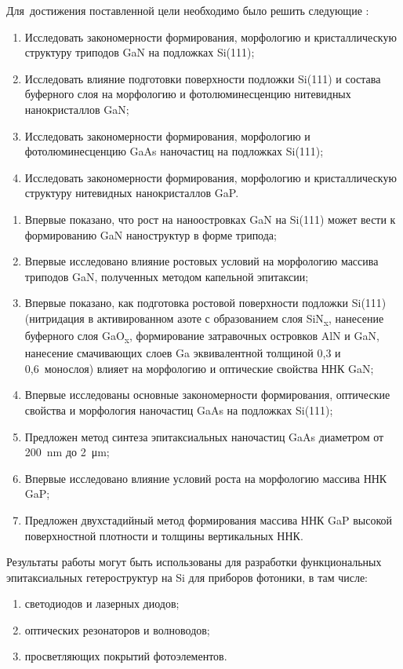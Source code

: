 Для~достижения поставленной цели необходимо было решить следующие {\tasks}:
\begin{enumerate}[beginpenalty=10000] %
  \item	Исследовать закономерности формирования, морфологию и кристаллическую структуру триподов GaN на подложках Si(111);
  \item	Исследовать влияние подготовки поверхности подложки Si(111) и состава буферного слоя на морфологию и фотолюминесценцию нитевидных нанокристаллов GaN;
  \item Исследовать закономерности формирования, морфологию и фотолюминесценцию GaAs наночастиц на подложках Si(111);
  \item Исследовать закономерности формирования, морфологию и кристаллическую структуру нитевидных нанокристаллов GaP.
\end{enumerate}


{\novelty}
\begin{enumerate}[beginpenalty=10000] %
  \item Впервые показано, что рост на наноостровках GaN на Si(111) может вести к формированию GaN наноструктур в форме трипода;
  \item Впервые исследовано влияние ростовых условий на морфологию массива триподов GaN, полученных методом капельной эпитаксии;
  \item Впервые показано, как подготовка ростовой поверхности подложки Si(111) (нитридация в активированном азоте с образованием слоя SiN\textsubscript{x}, нанесение буферного слоя GaO\textsubscript{x}, формирование затравочных островков AlN и GaN, нанесение смачивающих слоев Ga эквивалентной толщиной 0,3 и 0,6~монослоя) влияет на морфологию и оптические свойства ННК GaN;
  \item	Впервые исследованы основные закономерности формирования, оптические свойства и морфология наночастиц GaAs на подложках Si(111);
  \item	Предложен метод синтеза эпитаксиальных наночастиц GaAs диаметром от 200~\si{\nano\meter} до 2~\si{\micro\metre};
  \item	Впервые исследовано влияние условий роста на морфологию массива ННК GaP;
  \item Предложен двухстадийный метод формирования массива ННК GaP высокой поверхностной плотности и толщины вертикальных ННК.
\end{enumerate}

{\influence} Результаты работы могут быть использованы для разработки функциональных эпитаксиальных гетероструктур на Si для приборов фотоники, в там числе:
\begin{enumerate}[beginpenalty=10000]
	\item светодиодов и лазерных диодов;
	\item оптических резонаторов и волноводов;
	\item просветляющих покрытий фотоэлементов.
\end{enumerate}


